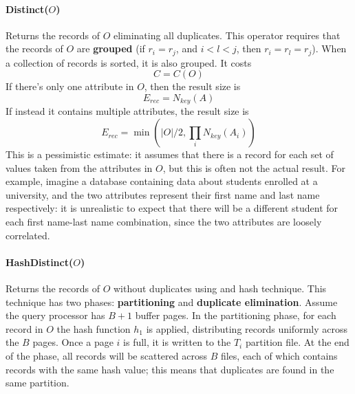 \paragraph{Distinct($O$)}
Returns the records of $O$ eliminating all duplicates. This operator requires that the records of $O$ are \textbf{grouped} (if $r_i = r_j$, and $i < l < j$, then $r_i = r_l = r_j$). When a collection of records is sorted, it is also grouped. It costs
\begin{equation*}
    C = C(O)
\end{equation*}
If there's only one attribute in $O$, then the result size is
\begin{equation*}
    E_{rec} = N_{key}(A)
\end{equation*}
If instead it contains multiple attributes, the result size is
\begin{equation*}
    E_{rec} = \min(|O|/2, \prod_i N_{key}(A_i))
\end{equation*}
This is a pessimistic estimate: it assumes that there is a record for each set of values taken from the attributes in $O$, but this is often not the actual result. For example, imagine a database containing data about students enrolled at a university, and the two attributes represent their first name and last name respectively: it is unrealistic to expect that there will be a different student for each first name-last name combination, since the two attributes are loosely correlated.

\paragraph{HashDistinct($O$)}
Returns the records of $O$ without duplicates using and hash technique. This technique has two phases: \textbf{partitioning} and \textbf{duplicate elimination}. Assume the query processor has $B+1$ buffer pages. In the partitioning phase, for each record in $O$ the hash function $h_1$ is applied, distributing records uniformly across the $B$ pages. Once a page $i$ is full, it is written to the $T_i$ partition file. At the end of the phase, all records will be scattered across $B$ files, each of which contains records with the same hash value; this means that duplicates are found in the same partition.

